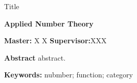 \newpage
\thispagestyle{empty}  %

\centerline{Title}

\begin{center}
    {\textbf{Applied Number Theory}}
\end{center}

\begin{center}
    \hspace{1cm} \textbf{Master:} \quad X X \hspace{1.5cm} \textbf{Supervisor:}\quad XXX
\end{center}

\vskip 10bp
{
\hspace{5bp}\textbf{Abstract}
{\small
abstract.
}

\hspace{5bp}\textbf{Keywords:}
{\small nubmber; function; category}
}
